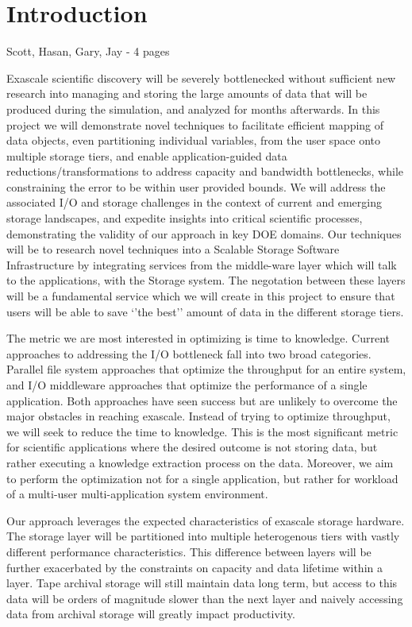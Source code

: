 \section*{Introduction} {\color{red} Scott, Hasan, Gary, Jay - 4 pages}
\label{sec:introduction}

Exascale scientific discovery will be severely bottlenecked without
sufficient new research into managing and storing the large amounts of data
that will be produced during the simulation, and analyzed for months
afterwards.
%
In this project we will demonstrate novel techniques to facilitate efficient
mapping of data objects, even partitioning individual variables, from the
user space onto multiple storage tiers, and enable application-guided data
reductions/transformations to address capacity and bandwidth bottlenecks,
while constraining the error to be within user provided bounds.
%
We will address the associated I/O and storage challenges in the context of
current and emerging storage landscapes, and expedite insights into critical
scientific processes, demonstrating the validity of our approach in key DOE
domains. Our techniques will be to research novel techniques into a Scalable
Storage Software Infrastructure by integrating services from the middle-ware
layer which will talk to the applications, with the Storage system. The
negotation between these layers will be a fundamental service which we will
create in this project to ensure that users will be able to save `'the
best'' amount of data in the different storage tiers.

The metric we are most interested in optimizing is time to knowledge.
Current approaches to addressing the I/O bottleneck fall into two broad
categories. Parallel file system approaches that optimize the throughput for
an entire system, and I/O middleware approaches that optimize the
performance of a single application. Both approaches have seen success but
are unlikely to overcome the major obstacles in reaching exascale. Instead
of trying to optimize throughput, we will seek to reduce the time to
knowledge. This is the most significant metric for scientific applications
where the desired outcome is not storing data, but rather executing a
knowledge extraction process on the data. Moreover, we aim to perform the
optimization not for a single application, but rather for workload of a
multi-user multi-application system environment.

Our approach leverages the expected characteristics of exascale storage
hardware. The storage layer will be partitioned into multiple heterogenous
tiers with vastly different performance characteristics. This difference
between layers will be further exacerbated by the constraints on capacity
and data lifetime within a layer. Tape archival storage will still maintain
data long term, but access to this data will be orders of magnitude slower
than the next layer and naively accessing data from archival storage will
greatly impact productivity.

